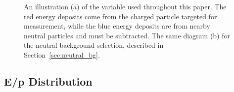 \begin{figure}[htbp]
\centering
{}
\caption{An illustration (a) of the \ep variable used throughout this paper. The red energy deposits come from the charged particle targeted for measurement, while the blue energy deposits are from nearby neutral particles and must be subtracted. The same diagram (b) for the neutral-background selection, described in Section~\ref{sec:neutral_bg}.}
\label{fig:eoverp_cartoon}
\end{figure}

\subsection{E/p Distribution}

